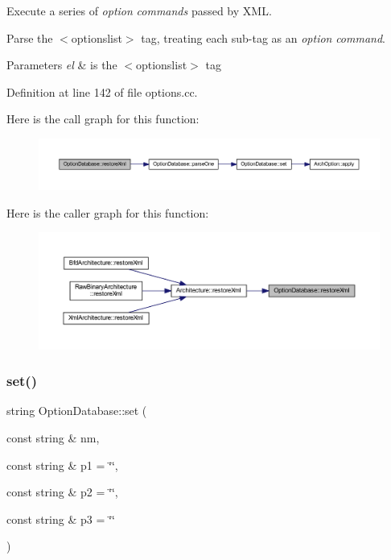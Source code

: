 Execute a series of {\itshape option} {\itshape commands} passed by X\+ML. 

Parse the $<$optionslist$>$ tag, treating each sub-\/tag as an {\itshape option} {\itshape command}. 
\begin{DoxyParams}{Parameters}
{\em el} & is the $<$optionslist$>$ tag \\
\hline
\end{DoxyParams}


Definition at line 142 of file options.\+cc.

Here is the call graph for this function\+:
\nopagebreak
\begin{figure}[H]
\begin{center}
\leavevmode
\includegraphics[width=350pt]{class_option_database_afe0ea0f1c7a7cd2591ac159027082149_cgraph}
\end{center}
\end{figure}
Here is the caller graph for this function\+:
\nopagebreak
\begin{figure}[H]
\begin{center}
\leavevmode
\includegraphics[width=350pt]{class_option_database_afe0ea0f1c7a7cd2591ac159027082149_icgraph}
\end{center}
\end{figure}
\mbox{\label{class_option_database_aaec7650371cbbb2a17a88393347c9ffc}} 
\subsubsection{\texorpdfstring{set()}{set()}}
{\footnotesize\ttfamily string Option\+Database\+::set (\begin{DoxyParamCaption}\item[{const string \&}]{nm,  }\item[{const string \&}]{p1 = {\ttfamily \char`\"{}\char`\"{}},  }\item[{const string \&}]{p2 = {\ttfamily \char`\"{}\char`\"{}},  }\item[{const string \&}]{p3 = {\ttfamily \char`\"{}\char`\"{}} }\end{DoxyParamCaption})}



